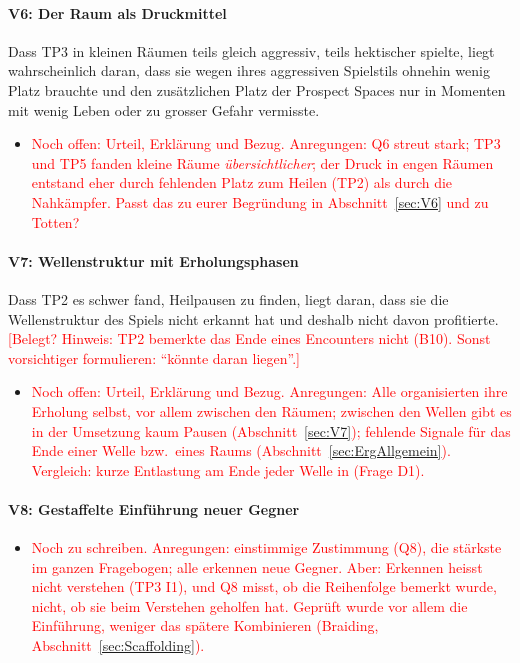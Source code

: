 \documentclass[../Main.tex]{subfiles}
\begin{document}
\paragraph{V6: Der Raum als Druckmittel}
Dass TP3 in kleinen Räumen teils gleich aggressiv, teils hektischer spielte, liegt wahrscheinlich daran, dass sie wegen ihres aggressiven Spielstils ohnehin wenig Platz brauchte und den zusätzlichen Platz der Prospect Spaces nur in Momenten mit wenig Leben oder zu grosser Gefahr vermisste.

\begin{itemize}[leftmargin=1.5cm]
    \item \textcolor{red}{Noch offen: Urteil, Erklärung und Bezug. Anregungen: Q6 streut stark; TP3 und TP5 fanden kleine Räume \emph{übersichtlicher}; der Druck in engen Räumen entstand eher durch fehlenden Platz zum Heilen (TP2) als durch die Nahkämpfer. Passt das zu eurer Begründung in Abschnitt~\ref{sec:V6} und zu Totten?}
\end{itemize}

\paragraph{V7: Wellenstruktur mit Erholungsphasen}
Dass TP2 es schwer fand, Heilpausen zu finden, liegt daran, dass sie die Wellenstruktur des Spiels nicht erkannt hat und deshalb nicht davon profitierte. \textcolor{red}{[Belegt? Hinweis: TP2 bemerkte das Ende eines Encounters nicht (B10). Sonst vorsichtiger formulieren: \enquote{könnte daran liegen}.]}

\begin{itemize}[leftmargin=1.5cm]
    \item \textcolor{red}{Noch offen: Urteil, Erklärung und Bezug. Anregungen: Alle organisierten ihre Erholung selbst, vor allem zwischen den Räumen; zwischen den Wellen gibt es in der Umsetzung kaum Pausen (Abschnitt~\ref{sec:V7}); fehlende Signale für das Ende einer Welle bzw.\ eines Raums (Abschnitt~\ref{sec:ErgAllgemein}). Vergleich: kurze Entlastung am Ende jeder Welle in  (Frage D1).}
\end{itemize}

\paragraph{V8: Gestaffelte Einführung neuer Gegner}
\begin{itemize}[leftmargin=1.5cm]
    \item \textcolor{red}{Noch zu schreiben. Anregungen: einstimmige Zustimmung (Q8), die stärkste im ganzen Fragebogen; alle erkennen neue Gegner. Aber: Erkennen heisst nicht verstehen (TP3 I1), und Q8 misst, ob die Reihenfolge bemerkt wurde, nicht, ob sie beim Verstehen geholfen hat. Geprüft wurde vor allem die Einführung, weniger das spätere Kombinieren (Braiding, Abschnitt~\ref{sec:Scaffolding}).}
\end{itemize}
\end{document}
